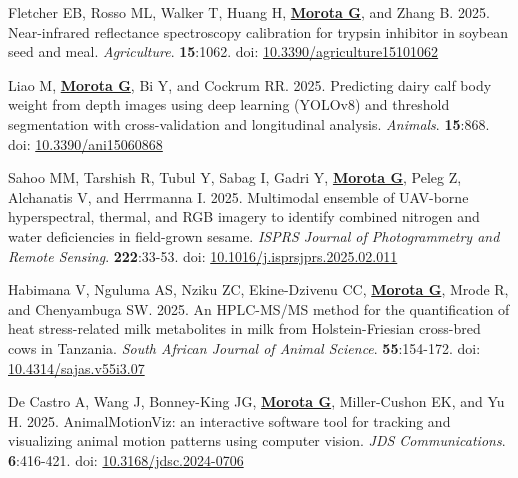 \documentclass[margin,line,10pt]{res}
\newenvironment{list1}{
  \begin{list}{\ding{113}}{%
      \setlength{\itemsep}{0in}
      \setlength{\parsep}{0in} \setlength{\parskip}{0in}
      \setlength{\topsep}{0in} \setlength{\partopsep}{0in} 
      \setlength{\leftmargin}{0.17in}}}{\end{list}}
\begin{document}
\begin{resume}
\begin{list1}
  \vspace{0.5cm}

  \item [{\bf 83}.] Fletcher EB, Rosso ML, Walker T, Huang H, \textbf{\underline{Morota G}}, and Zhang B. 2025. Near-infrared reflectance spectroscopy calibration for trypsin inhibitor in soybean seed and meal. \emph{Agriculture}. \textbf{15}:1062. doi: \textcolor{blue}{\href{https://doi.org/10.3390/agriculture15101062}{10.3390/agriculture15101062}}

  \vspace{0.5cm}


  \item [{\bf 82}.] Liao M, \textbf{\underline{Morota G}}, Bi Y, and Cockrum RR. 2025. Predicting dairy calf body weight from depth images using deep learning (YOLOv8) and threshold segmentation with cross-validation and longitudinal analysis. \emph{Animals}. \textbf{15}:868. doi: \textcolor{blue}{\href{https://doi.org/10.3390/ani15060868}{10.3390/ani15060868}}

  \vspace{0.5cm}

  \item  [{\bf 81}.] Sahoo MM, Tarshish R, Tubul Y, Sabag I, Gadri Y, \textbf{\underline{Morota G}}, Peleg Z, Alchanatis V, and Herrmanna I. 2025. Multimodal ensemble of UAV-borne hyperspectral, thermal, and RGB imagery to identify combined nitrogen and water deficiencies in field-grown sesame. \emph{ISPRS Journal of Photogrammetry and Remote Sensing}. \textbf{222}:33-53. doi: \textcolor{blue}{\href{https://doi.org/10.1016/j.isprsjprs.2025.02.011}{10.1016/j.isprsjprs.2025.02.011}}

  \vspace{0.5cm}

  \item  [{\bf 80}.] Habimana V, Nguluma AS, Nziku ZC, Ekine-Dzivenu CC, \textbf{\underline{Morota G}}, Mrode R, and Chenyambuga SW. 2025. An HPLC-MS/MS method for the quantification of heat stress-related milk metabolites in milk from Holstein-Friesian cross-bred cows in Tanzania. \emph{South African Journal of Animal Science}.  \textbf{55}:154-172. doi: \textcolor{blue}{\href{https://dx.doi.org/10.4314/sajas.v55i3.07}{10.4314/sajas.v55i3.07}}

  \vspace{0.5cm}

  \item [{\bf 79}.] De Castro A, Wang J, Bonney-King JG, \textbf{\underline{Morota G}}, Miller-Cushon EK, and Yu H. 2025. AnimalMotionViz: an interactive software tool for tracking and visualizing animal motion patterns using computer vision. \emph{JDS Communications}. \textbf{6}:416-421. doi: \textcolor{blue}{\href{https://doi.org/10.3168/jdsc.2024-0706}{10.3168/jdsc.2024-0706}}



\end{list1}
\end{resume}
\end{document}
